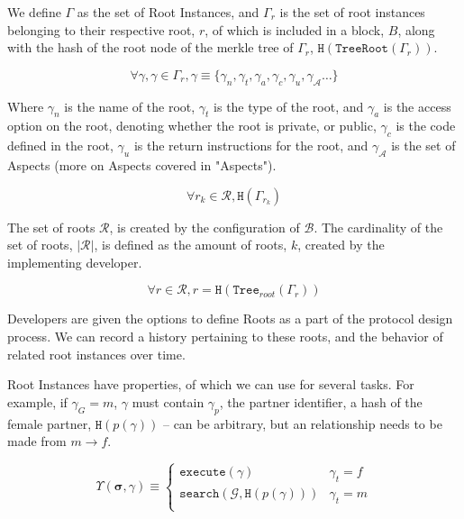 \documentclass[12pt, titlepage, twocolumn]{report}
\begin{document}
We define \(\Gamma\) as the set of Root Instances, and \(\Gamma_r\) is the set of root instances belonging to their respective root, \(r\), of which is included in a block, \(B\), along with the hash of the root node of the merkle tree of \(\Gamma_r\), \(\boldsymbol{\texttt{H}}(\texttt{TreeRoot}({\Gamma_r}))\).

\begin{equation}
\forall \gamma, \gamma \in \Gamma_r , \gamma \equiv \{\gamma_{n}, \gamma_{t},\gamma_{a}, \gamma_{c}, \gamma_{u}, \gamma_{\boldsymbol{\mathcal{A}}} \ldots\}
\end{equation}

Where \(\gamma_{n}\) is the name of the root, \(\gamma_{t}\) is the type of the root, and \(\gamma_{a}\) is the access option on the root, denoting whether the root is private, or public, \(\gamma_{c}\) is the code defined in the root, \(\gamma_{u}\) is the return instructions for the root, and \(\gamma_{\boldsymbol{\mathcal{A}}}\) is the set of Aspects (more on Aspects covered in "Aspects"). 

\begin{equation}
	{ \forall r_k \in \mathcal{R}, \boldsymbol{\texttt{H}}(\Gamma_{r_k}) }
\end{equation}


The set of roots \(\mathcal{R}\), is created by the configuration of \(\boldsymbol{\mathcal{B}}\). The cardinality of the set of roots, \( \vert \mathcal{R} \vert \), is defined as the amount of roots, \(k\), created by the implementing developer. 

\begin{equation}
\forall r \in \mathcal{R}, r = \texttt{H}( \texttt{Tree}_{root}(\Gamma_r))
\end{equation}


Developers are given the options to define Roots as a part of the protocol design process. We can record a history pertaining to these roots, and the behavior of related root instances over time.

Root Instances have properties, of which we can use for several tasks. For example, if \(\gamma_{G} = m\), \(\gamma\) must contain \(\gamma_{p}\), the partner identifier, a hash of the female partner, \( \texttt{H}(p(\gamma)) \) -- can be arbitrary, but an relationship needs to be made from \(m \rightarrow f\).

\begin{equation}
\Upsilon(\boldsymbol{\sigma},\gamma) \equiv  \begin{cases} 
      \texttt{execute}(\gamma) & \gamma_{t} = f \\
      \texttt{search}(\mathcal{G}, \texttt{H}(p(\gamma)))   & \gamma_{t} = m  \\
   \end{cases}
\end{equation}
\end{document}
